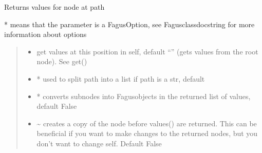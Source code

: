 \documentclass[a4paper,10pt,english]{sphinxmanual}
\begin{document}
\begin{fulllineitems}
\begin{fulllineitems}
\begin{quote}
\begin{description}
\end{description}\end{quote}

\end{fulllineitems}


\begin{fulllineitems}
\label{\detokenize{fagus.fagus:fagus.fagus.Fagus.values}}
\pysigstartsignatures
{}
\pysigstopsignatures
\sphinxAtStartPar
Returns values for node at path

\sphinxAtStartPar
* means that the parameter is a FagusOption, see Fagus\sphinxhyphen{}class\sphinxhyphen{}docstring for more information about options
\begin{quote}\begin{description}
\begin{itemize}
\item {}
\sphinxAtStartPar
{} \textendash{} get values at this position in self, default “” (gets values from the root node). See get()

\item {}
\sphinxAtStartPar
{} \textendash{} * used to split path into a list if path is a str, default 

\item {}
\sphinxAtStartPar
{} \textendash{} * converts sub\sphinxhyphen{}nodes into Fagus\sphinxhyphen{}objects in the returned list of values, default False

\item {}
\sphinxAtStartPar
{} \textendash{} \textasciitilde{} creates a copy of the node before values() are returned. This can be beneficial if you want to make
changes to the returned nodes, but you don’t want to change self. Default False


\end{itemize}
\end{description}
\end{quote}
\end{fulllineitems}
\end{fulllineitems}
\end{document}

